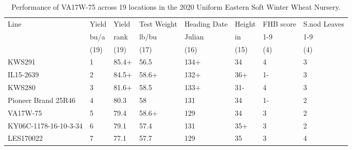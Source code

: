 \documentclass[12pt, letterpaper]{article}
\begin{document}
\begin{landscape}
\begin{table}
\caption{Performance of VA17W-75 across 19 locations in the 2020 Uniform Eastern Soft Winter Wheat Nursery.}
\label{uen}
\footnotesize
\begin{tabular}{llllllll}
  \toprule
Line & Yield & Yield & Test Weight & Heading Date & Height & FHB score & S.nod Leaves \\ 
 & bu/a & rank & lb/bu & Julian & in & 1-9 & 1-9 \\ 
   & (19) & (19) & (17) & (16) & (15) & (4) & (4) \\ 
  \midrule
  KWS291 &  1 & 85.4+ & 56.5 & 134+ & 34 & 4 & 3 \\ 
  IL15-2639 &  2 & 84.5+ & 58.6+ & 132+ & 36+ & 1- & 3 \\ 
  KWS280 &  3 & 81.6+ & 58.5 & 133+ & 31- & 4 & 3 \\ 
  Pioneer Brand 25R46 &  4 & 80.3 & 58 & 131 & 34 & 1- & 2 \\ 
  VA17W-75 &  5 & 79.4 & 58.6+ & 129 & 34 & 3 & 2 \\ 
  KY06C-1178-16-10-3-34 &  6 & 79.1 & 57.4 & 131 & 35+ & 3 & 2 \\ 
  LES170022 &  7 & 77.1 & 57.7 & 129 & 35 & 3 & 4 \\ 

\end{tabular}
\end{table}
\end{landscape}
\end{document}
